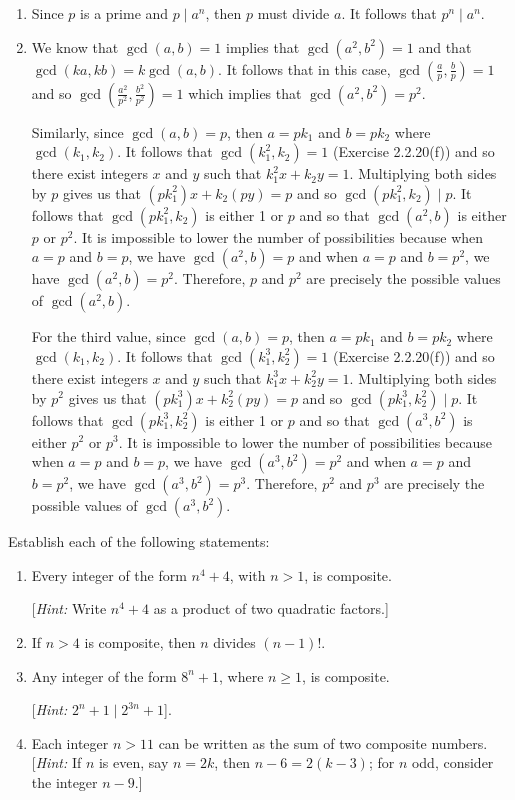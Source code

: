 \begin{solution}
    \begin{enumerate}
        \item Since $p$ is a prime and $p \mid a^n$, then $p$ must divide $a$. It follows that $p^n \mid a^n$.
        \item We know that $\gcd(a,b) = 1$ implies that $\gcd(a^2, b^2) = 1$ and that $\gcd(ka,kb) = k\gcd(a,b)$. It follows that in this case, $\gcd(\frac{a}{p}, \frac{b}{p}) = 1$ and so $\gcd(\frac{a^2}{p^2}, \frac{b^2}{p^2}) = 1$ which implies that $\gcd(a^2, b^2) = p^2$. 
        
        Similarly, since $\gcd(a,b) = p$, then $a = pk_1$ and $b = pk_2$ where $\gcd(k_1, k_2)$. It follows that $\gcd(k_1^2, k_2) = 1$ (Exercise 2.2.20(f)) and so there exist integers $x$ and $y$ such that $k_1^2x + k_2y = 1$. Multiplying both sides by $p$ gives us that $(pk_1^2)x + k_2(py) = p$ and so $\gcd(pk_1^2, k_2) \mid p$. It follows that $\gcd(pk_1^2, k_2)$ is either 1 or $p$ and so that $\gcd(a^2, b)$ is either $p$ or $p^2$. It is impossible to lower the number of possibilities because when $a = p$ and $b = p$, we have $\gcd(a^2, b) = p$ and when $a = p$ and $b = p^2$, we have $\gcd(a^2, b) = p^2$. Therefore, $p$ and $p^2$ are precisely the possible values of $\gcd(a^2, b)$.

        For the third value, since $\gcd(a,b) = p$, then $a = pk_1$ and $b = pk_2$ where $\gcd(k_1, k_2)$. It follows that $\gcd(k_1^3, k_2^2) = 1$ (Exercise 2.2.20(f)) and so there exist integers $x$ and $y$ such that $k_1^3x + k_2^2y = 1$. Multiplying both sides by $p^2$ gives us that $(pk_1^3)x + k_2^2(py) = p$ and so $\gcd(pk_1^3, k_2^2) \mid p$. It follows that $\gcd(pk_1^3, k_2^2)$ is either 1 or $p$ and so that $\gcd(a^3, b^2)$ is either $p^2$ or $p^3$. It is impossible to lower the number of possibilities because when $a = p$ and $b = p$, we have $\gcd(a^3, b^2) = p^2$ and when $a = p$ and $b = p^2$, we have $\gcd(a^3, b^2) = p^3$. Therefore, $p^2$ and $p^3$ are precisely the possible values of $\gcd(a^3, b^2)$.
    \end{enumerate}
\end{solution}

\begin{exercise}
    Establish each of the following statements:
    \begin{enumerate}
        \item Every integer of the form $n^4 + 4$, with $n > 1$, is composite.
        
        [\textit{Hint:} Write $n^4 + 4$ as a product of two quadratic factors.]
        \item If $n > 4$ is composite, then $n$ divides $(n-1)!$.
        \item Any integer of the form $8^n + 1$, where $n \geq 1$, is composite.
        
        [\textit{Hint:} $2^n + 1 \mid 2^{3n} + 1$].
        \item Each integer $n > 11$ can be written as the sum of two composite numbers. [\textit{Hint:} If $n$ is even, say $n = 2k$, then $n - 6 = 2(k-3)$; for $n$ odd, consider the integer $n - 9$.]
    \end{enumerate}
\end{exercise}

